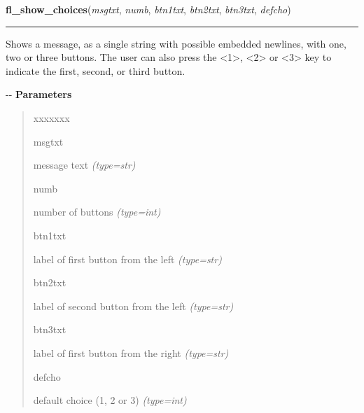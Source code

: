     \vspace{0.5ex}

\hspace{.8\funcindent}\begin{boxedminipage}{\funcwidth}

    \raggedright \textbf{fl\_show\_choices}(\textit{msgtxt}, \textit{numb}, \textit{btn1txt}, \textit{btn2txt}, \textit{btn3txt}, \textit{defcho})

    \vspace{-1.5ex}

    \rule{\textwidth}{0.5\fboxrule}
\setlength{\parskip}{2ex}

Shows a message, as a single string with possible embedded newlines,
with one, two or three buttons. The user can also press the <1>, <2> or
<3> key to indicate the first, second, or third button.

-{}-
\setlength{\parskip}{1ex}
      \textbf{Parameters}
      \vspace{-1ex}

      \begin{quote}
        \begin{Ventry}{xxxxxxx}

          \item[msgtxt]


message text
            {\it (type=str)}

          \item[numb]


number of buttons
            {\it (type=int)}

          \item[btn1txt]


label of first button from the left
            {\it (type=str)}

          \item[btn2txt]


label of second button from the left
            {\it (type=str)}

          \item[btn3txt]


label of first button from the right
            {\it (type=str)}

          \item[defcho]


default choice (1, 2 or 3)
            {\it (type=int)}

        \end{Ventry}

      \end{quote}


\end{boxedminipage}
